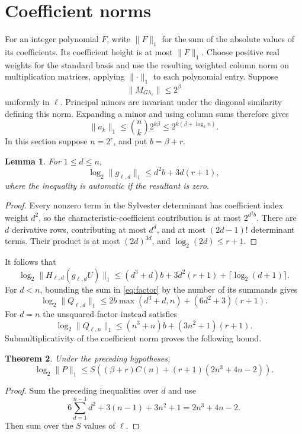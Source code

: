 \documentclass[11pt,a4paper]{article}
\newtheorem{theorem}{Theorem}[section]
\newtheorem{lemma}[theorem]{Lemma}
\begin{document}
\section{Coefficient norms}

For an integer polynomial $F$, write $\lVert F\rVert_1$ for
the sum of the absolute values of its coefficients. Its coefficient
height is at most $\lVert F\rVert_1$. Choose positive real weights
for the standard basis and use the resulting weighted column norm
on multiplication matrices, applying $\lVert\cdot\rVert_1$ to
each polynomial entry. Suppose
\[
                  \lVert M_{G\lambda_\ell}\rVert\le2^\beta
\]
uniformly in $\ell$. Principal minors are invariant under the
diagonal similarity defining this norm. Expanding a minor and using
column sums therefore gives
\[
 \lVert a_k\rVert_1\le {n\choose k}2^{k\beta}
                         \le2^{k(\beta+\log_2 n)}.
\]
In this section suppose $n=2^r$, and put $b=\beta+r$.

\begin{lemma}\label{lem:resnorm}
For $1\le d\le n$,
\[
 \log_2\lVert g_{\ell,d}\rVert_1
      \le d^2b+3d(r+1),
\]
where the inequality is automatic if the resultant is zero.
\end{lemma}
\begin{proof}
Every nonzero term in the Sylvester determinant has coefficient
index weight $d^2$, so the characteristic-coefficient contribution
is at most $2^{d^2b}$. There are $d$ derivative rows, contributing
at most $d^d$, and at most $(2d-1)!$ determinant terms. Their
product is at most $(2d)^{3d}$, and $\log_2(2d)\le r+1$.
\end{proof}

It follows that
\[
 \log_2\lVert H_{\ell,d}(g_{\ell,d}U)\rVert_1
       \le(d^3+d)b+3d^2(r+1)+\lceil\log_2(d+1)\rceil.
\]
For $d<n$, bounding the sum in \eqref{eq:factor} by the number
of its summands gives
\[
 \log_2\lVert Q_{\ell,d}\rVert_1
 \le2b\max(d^3+d,n)+(6d^2+3)(r+1).
\]
For $d=n$ the unsquared factor instead satisfies
\[
 \log_2\lVert Q_{\ell,n}\rVert_1
 \le(n^3+n)b+(3n^2+1)(r+1).
\]
Submultiplicativity of the coefficient norm proves the following bound.

\begin{theorem}\label{thm:norm}
Under the preceding hypotheses,
\begin{equation}\label{eq:normbound}
 \log_2\lVert P\rVert_1
 \le S\left((\beta+r)C(n)+(r+1)(2n^3+4n-2)\right).
\end{equation}
\end{theorem}
\begin{proof}
Sum the preceding inequalities over $d$ and use
\[
 6\sum_{d=1}^{n-1}d^2+3(n-1)+3n^2+1=2n^3+4n-2.
\]
Then sum over the $S$ values of $\ell$.
\end{proof}
\end{document}
